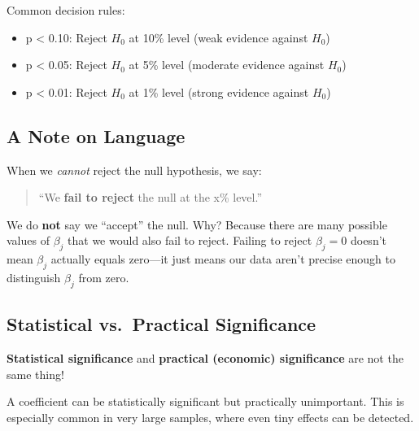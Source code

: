 \documentclass[
  letterpaper,
  DIV=11,
  numbers=noendperiod]{scrreprt}
\providecommand{\tightlist}{%
  \setlength{\itemsep}{0pt}\setlength{\parskip}{0pt}}
\begin{document}
Common decision rules:

\begin{itemize}
\tightlist
\item
  p \textless{} 0.10: Reject \(H_0\) at 10\% level (weak evidence
  against \(H_0\))
\item
  p \textless{} 0.05: Reject \(H_0\) at 5\% level (moderate evidence
  against \(H_0\))
\item
  p \textless{} 0.01: Reject \(H_0\) at 1\% level (strong evidence
  against \(H_0\))
\end{itemize}

\subsection{A Note on Language}\label{a-note-on-language}

When we \emph{cannot} reject the null hypothesis, we say:

\begin{quote}
``We \textbf{fail to reject} the null at the x\% level.''
\end{quote}

We do \textbf{not} say we ``accept'' the null. Why? Because there are
many possible values of \(\beta_j\) that we would also fail to reject.
Failing to reject \(\beta_j = 0\) doesn't mean \(\beta_j\) actually
equals zero---it just means our data aren't precise enough to
distinguish \(\beta_j\) from zero.

\subsection{Statistical vs.~Practical
Significance}\label{statistical-vs.-practical-significance}

\begin{tcolorbox}[enhanced jigsaw, arc=.35mm, bottomrule=.15mm, bottomtitle=1mm, breakable, colback=white, colbacktitle=quarto-callout-warning-color!10!white, colframe=quarto-callout-warning-color-frame, coltitle=black, left=2mm, leftrule=.75mm, opacityback=0, opacitybacktitle=0.6, rightrule=.15mm, title=\textcolor{quarto-callout-warning-color}{\faExclamationTriangle}\hspace{0.5em}{Important Distinction}, titlerule=0mm, toprule=.15mm, toptitle=1mm]

\textbf{Statistical significance} and \textbf{practical (economic)
significance} are not the same thing!

A coefficient can be statistically significant but practically
unimportant. This is especially common in very large samples, where even
tiny effects can be detected.

\end{tcolorbox}
\end{document}
